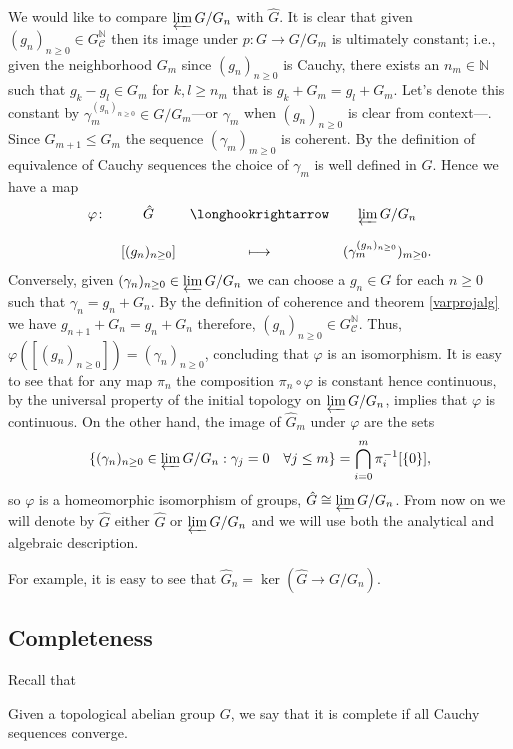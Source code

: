 We would like to compare $\varprojlim G/G_n$ with $\hat G$. It is clear that given $(g_n)_{n\geq 0}\in G^\mathbb N_\mathcal C$ then its image under $p\colon G\to G/G_m$ is ultimately constant; i.e., given the neighborhood $G_m$ since $(g_n)_{n\geq 0}$ is Cauchy, there exists an $n_m\in\mathbb N$ such that $g_k-g_l\in G_m$ for $k,l\geq n_m$ that is $g_k+G_m=g_l+G_m$. Let's denote this constant by $\gamma^{(g_n)_{n\geq 0}}_m\in G/G_m$---or $\gamma_m$ when $(g_n)_{n\geq 0}$ is clear from context---. Since $G_{m+1}\leq G_m$ the sequence $(\gamma_m)_{m\geq 0}$ is coherent. By the definition of equivalence of Cauchy sequences the choice of $\gamma_m$ is well defined in $\hat G$. Hence we have a map
\[
\begin{matrix}
\varphi\colon &\hat G&\longhookrightarrow &\varprojlim G/G_n \\
&&&\\
&[(g_n)_{n\geq 0}] &\longmapsto & (\gamma^{(g_n)_{n\geq 0}}_m)_{m\geq 0}.
\end{matrix}
\]
Conversely, given $(\gamma_n)_{n\geq 0}\in\varprojlim G/G_n$ we can choose a $g_n\in G$ for each $n\geq 0$ such that $\gamma_n=g_n+G_n$. By the definition of coherence and theorem \ref{varprojalg} we have $g_{n+1}+G_n=g_n+G_n$ therefore, $(g_n)_{n\geq 0}\in G^\mathbb N_\mathcal C$. Thus, $\varphi([(g_n)_{n\geq 0}])=(\gamma_n)_{n\geq 0}$, concluding that $\varphi$ is an isomorphism. It is easy to see that for any map $\pi_n$ the composition $\pi_n\circ\varphi$ is constant hence continuous, by the universal property of the initial topology on $\varprojlim G/G_n$, implies that $\varphi$ is continuous. On the other hand, the image of $\hat G_m$ under $\varphi$ are the sets 
\[
\{(\gamma_n)_{n\geq 0}\in\varprojlim G/G_n : \gamma_j=0 \quad \forall j\leq m\}=\bigcap_{i=0}^m\pi_i^{-1}[\{0\}],
\]
so $\varphi$ is a homeomorphic isomorphism of groups, $\hat G\cong\varprojlim G/G_n$. From now on we will denote by $\hat G$ either $\hat G$ or $\varprojlim G/G_n$ and we will use both the analytical and algebraic description. 

For example, it is easy to see that $\hat G_n=\ker(\hat G\to G/G_n)$.

\subsection{Completeness}

Recall that

\begin{defi}
    Given a topological abelian group $G$, we say that it is complete if all Cauchy sequences converge.
\end{defi}

